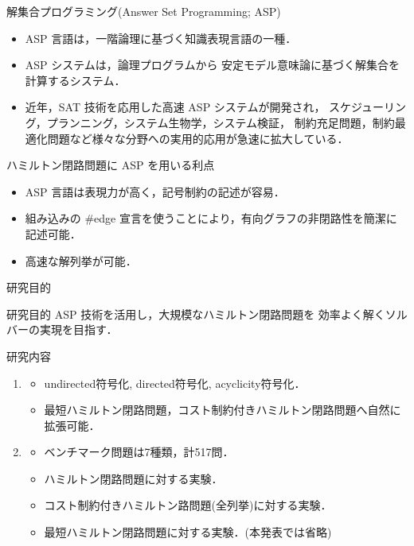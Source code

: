 \documentclass[dvipdfmx,10pt]{beamer}
\begin{document}
\begin{frame}{解集合プログラミング(Answer Set Programming; ASP)}
  \begin{itemize}
  \item \alert{ASP 言語}は，一階論理に基づく知識表現言語の一種．
  \item \alert{ASP システム}は，論理プログラムから
    安定モデル意味論に基づく解集合を計算するシステム．
  \item 近年，SAT 技術を応用した高速 ASP システムが開発され，
    スケジューリング，プランニング，システム生物学，システム検証，
    制約充足問題，制約最適化問題など様々な分野への実用的応用が急速に拡大している．
  \end{itemize}

  \begin{alertblock}{ハミルトン閉路問題に ASP を用いる利点}
    \begin{itemize}
    \item ASP 言語は表現力が高く，記号制約の記述が容易．
    \item 組み込みの \#edge 宣言を使うことにより，有向グラフの非閉路性を簡潔に記述可能．
    \item 高速な解列挙が可能．
    \end{itemize}
  \end{alertblock}
\end{frame}

\begin{frame}{研究目的}
  \begin{alertblock}{研究目的}
  ASP 技術を活用し，大規模なハミルトン閉路問題を
    効率よく解くソルバーの実現を目指す．
  \end{alertblock}
  \begin{block}{研究内容}
    \begin{enumerate}
    \item {}
      \begin{itemize}
      \item \textsf{undirected}符号化, \textsf{directed}符号化, \textsf{acyclicity}符号化．
      \item 最短ハミルトン閉路問題，コスト制約付きハミルトン閉路問題へ自然に拡張可能．
      \end{itemize}
    \item {}
      \begin{itemize}
      \item ベンチマーク問題は7種類，計517問．
      \item \alert{ハミルトン閉路問題に対する実験．}
      \item \alert{コスト制約付きハミルトン路問題(全列挙)に対する実験．}
      \item 最短ハミルトン閉路問題に対する実験．(本発表では省略)
      \end{itemize}
    \end{enumerate}
  \end{block}
\end{frame}
\end{document}
